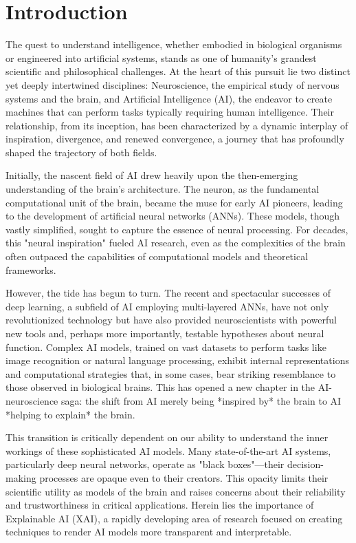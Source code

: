 \documentclass[11pt,a4paper]{article}
\begin{document}
\clearpage
\tableofcontents
\clearpage


\section{Introduction}

The quest to understand intelligence, whether embodied in biological organisms or engineered into artificial systems, stands as one of humanity's grandest scientific and philosophical challenges. At the heart of this pursuit lie two distinct yet deeply intertwined disciplines: Neuroscience, the empirical study of nervous systems and the brain, and Artificial Intelligence (AI), the endeavor to create machines that can perform tasks typically requiring human intelligence. Their relationship, from its inception, has been characterized by a dynamic interplay of inspiration, divergence, and renewed convergence, a journey that has profoundly shaped the trajectory of both fields.

Initially, the nascent field of AI drew heavily upon the then-emerging understanding of the brain's architecture. The neuron, as the fundamental computational unit of the brain, became the muse for early AI pioneers, leading to the development of artificial neural networks (ANNs). These models, though vastly simplified, sought to capture the essence of neural processing. For decades, this "neural inspiration" fueled AI research, even as the complexities of the brain often outpaced the capabilities of computational models and theoretical frameworks.

However, the tide has begun to turn. The recent and spectacular successes of deep learning, a subfield of AI employing multi-layered ANNs, have not only revolutionized technology but have also provided neuroscientists with powerful new tools and, perhaps more importantly, testable hypotheses about neural function. Complex AI models, trained on vast datasets to perform tasks like image recognition or natural language processing, exhibit internal representations and computational strategies that, in some cases, bear striking resemblance to those observed in biological brains. This has opened a new chapter in the AI-neuroscience saga: the shift from AI merely being *inspired by* the brain to AI *helping to explain* the brain.

This transition is critically dependent on our ability to understand the inner workings of these sophisticated AI models. Many state-of-the-art AI systems, particularly deep neural networks, operate as "black boxes"—their decision-making processes are opaque even to their creators. This opacity limits their scientific utility as models of the brain and raises concerns about their reliability and trustworthiness in critical applications. Herein lies the importance of Explainable AI (XAI), a rapidly developing area of research focused on creating techniques to render AI models more transparent and interpretable.
\end{document}
